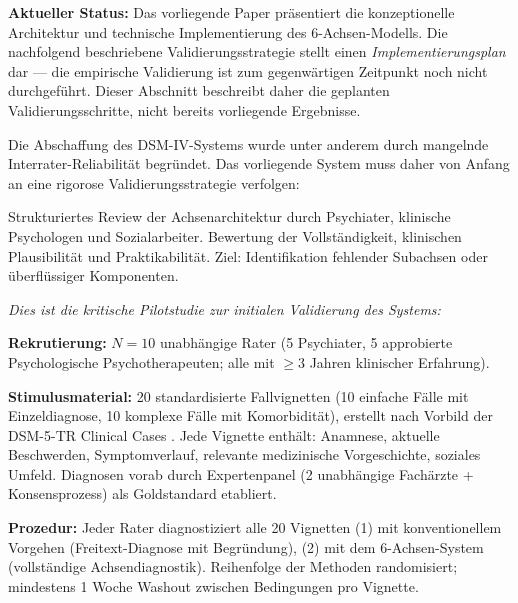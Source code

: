 \documentclass[11pt,a4paper]{article}
\begin{document}
\textbf{Aktueller Status:} Das vorliegende Paper pr\"asentiert die konzeptionelle Architektur und technische Implementierung des 6-Achsen-Modells. Die nachfolgend beschriebene Validierungsstrategie stellt einen \textit{Implementierungsplan} dar --- die empirische Validierung ist zum gegenw\"artigen Zeitpunkt noch nicht durchgef\"uhrt. Dieser Abschnitt beschreibt daher die geplanten Validierungsschritte, nicht bereits vorliegende Ergebnisse.

Die Abschaffung des DSM-IV-Systems wurde unter anderem durch mangelnde Interrater-Reliabilit\"at begr\"undet. Das vorliegende System muss daher von Anfang an eine rigorose Validierungsstrategie verfolgen:

\begin{description}[style=nextline, leftmargin=1.5cm, font=\bfseries]
\item[Phase~1: Experten-Review (N=10--15)] Strukturiertes Review der Achsenarchitektur durch Psychiater, klinische Psychologen und Sozialarbeiter. Bewertung der Vollst\"andigkeit, klinischen Plausibilit\"at und Praktikabilit\"at. Ziel: Identifikation fehlender Subachsen oder \"uberfl\"ussiger Komponenten.

\item[Phase~2: Inter-Rater-Reliabilit\"atsstudie mit Fallvignetten (N=10 Rater, 20 Vignetten)] \textit{Dies ist die kritische Pilotstudie zur initialen Validierung des Systems:}

\textbf{Rekrutierung:} $N = 10$ unabh\"angige Rater (5 Psychiater, 5 approbierte Psychologische Psychotherapeuten; alle mit $\geq 3$ Jahren klinischer Erfahrung).

\textbf{Stimulusmaterial:} 20 standardisierte Fallvignetten (10 einfache F\"alle mit Einzeldiagnose, 10 komplexe F\"alle mit Komorbidit\"at), erstellt nach Vorbild der DSM-5-TR Clinical Cases \citep{BarnhillDSM5ClinicalCases}. Jede Vignette enth\"alt: Anamnese, aktuelle Beschwerden, Symptomverlauf, relevante medizinische Vorgeschichte, soziales Umfeld. Diagnosen vorab durch Expertenpanel (2 unabh\"angige Fach\"arzte + Konsensprozess) als Goldstandard etabliert.

\textbf{Prozedur:} Jeder Rater diagnostiziert alle 20 Vignetten (1) mit konventionellem Vorgehen (Freitext-Diagnose mit Begr\"undung), (2) mit dem 6-Achsen-System (vollst\"andige Achsendiagnostik). Reihenfolge der Methoden randomisiert; mindestens 1 Woche Washout zwischen Bedingungen pro Vignette.


\end{description}
\end{document}
